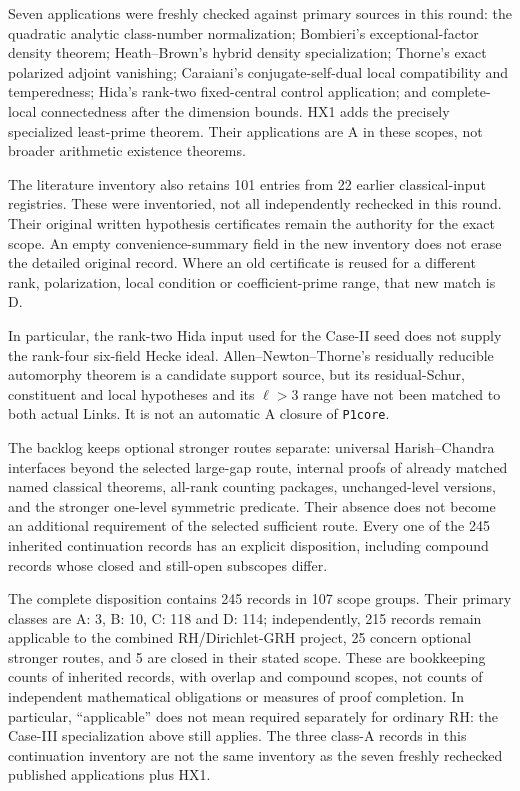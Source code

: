 Seven applications were freshly checked against primary sources in this
round: the quadratic analytic class-number normalization; Bombieri's
exceptional-factor density theorem; Heath--Brown's hybrid density
specialization; Thorne's exact polarized adjoint vanishing; Caraiani's
conjugate-self-dual local compatibility and temperedness; Hida's
rank-two fixed-central control application; and complete-local
connectedness after the dimension bounds.  HX1 adds the precisely
specialized least-prime theorem.  Their applications are A in these
scopes, not broader arithmetic existence theorems.

The literature inventory also retains 101 entries from 22 earlier
classical-input registries.  These were inventoried, not all independently
rechecked in this round.  Their original written hypothesis certificates
remain the authority for the exact scope.  An empty convenience-summary
field in the new inventory does not erase the detailed original record.
Where an old certificate is reused for a different rank, polarization,
local condition or coefficient-prime range, that new match is D.

In particular, the rank-two Hida input used for the Case-II seed does not
supply the rank-four six-field Hecke ideal.  Allen--Newton--Thorne's
residually reducible automorphy theorem is a candidate support source,
but its residual-Schur, constituent and local hypotheses and its
$\ell>3$ range have not been matched to both actual Links.  It is not
an automatic A closure of \texttt{P1core}.

The backlog keeps optional stronger routes separate: universal
Harish--Chandra interfaces beyond the selected large-gap route,
internal proofs of already matched named classical theorems, all-rank
counting packages, unchanged-level versions, and the stronger one-level
symmetric predicate.  Their absence does not become an additional
requirement of the selected sufficient route.  Every one of the 245
inherited continuation records has an explicit disposition, including
compound records whose closed and still-open subscopes differ.

The complete disposition contains 245 records in 107 scope groups.
Their primary classes are A: 3, B: 10, C: 118 and D: 114; independently,
215 records remain applicable to the combined RH/Dirichlet-GRH project,
25 concern optional stronger routes, and 5 are closed in their stated
scope.  These are bookkeeping counts of inherited records, with overlap
and compound scopes, not counts of independent mathematical obligations
or measures of proof completion.  In particular, ``applicable'' does not
mean required separately for ordinary RH: the Case-III specialization
above still applies.  The three class-A records in this continuation
inventory are not the same inventory as the seven freshly rechecked
published applications plus HX1.

